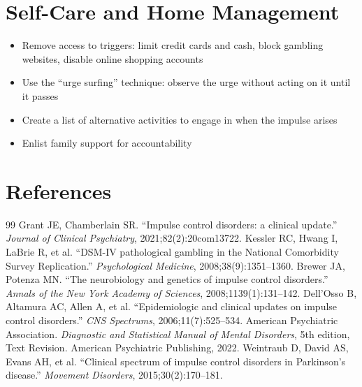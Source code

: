 \section*{Self-Care and Home Management}
\begin{itemize}
  \item Remove access to triggers: limit credit cards and cash, block gambling websites, disable online shopping accounts
  \item Use the ``urge surfing'' technique: observe the urge without acting on it until it passes
  \item Create a list of alternative activities to engage in when the impulse arises
  \item Enlist family support for accountability
\end{itemize}

\section*{References}
\begin{thebibliography}{99}
 Grant JE, Chamberlain SR. ``Impulse control disorders: a clinical update.'' \textit{Journal of Clinical Psychiatry}, 2021;82(2):20com13722.
 Kessler RC, Hwang I, LaBrie R, et al. ``DSM-IV pathological gambling in the National Comorbidity Survey Replication.'' \textit{Psychological Medicine}, 2008;38(9):1351--1360.
 Brewer JA, Potenza MN. ``The neurobiology and genetics of impulse control disorders.'' \textit{Annals of the New York Academy of Sciences}, 2008;1139(1):131--142.
 Dell'Osso B, Altamura AC, Allen A, et al. ``Epidemiologic and clinical updates on impulse control disorders.'' \textit{CNS Spectrums}, 2006;11(7):525--534.
 American Psychiatric Association. \textit{Diagnostic and Statistical Manual of Mental Disorders}, 5th edition, Text Revision. American Psychiatric Publishing, 2022.
 Weintraub D, David AS, Evans AH, et al. ``Clinical spectrum of impulse control disorders in Parkinson's disease.'' \textit{Movement Disorders}, 2015;30(2):170--181.

\end{thebibliography}
